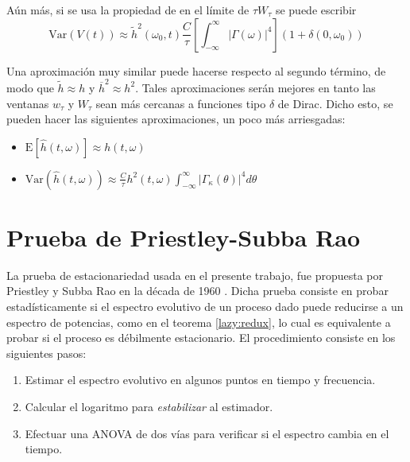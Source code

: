 \documentclass[12pt,letterpaper]{book}
\newcommand{\intR}{\int_{-\infty}^{\infty}}
\newcommand{\dirac}{$\delta$  de Dirac}
\newcommand{\est}[1]{\widehat{ #1 }}
\newcommand{\E}[1]{\mathrm{E}\left[ #1 \right]}
\newcommand{\Var}[1]{\mathrm{Var}\left( #1 \right)}
\newcommand{\abso}[1]{\left| #1 \right|}
\begin{document}
Aún más, si se usa la propiedad de en el límite de $\tau W_\tau$ se puede escribir
\begin{equation}
\Var{V(t)} \approx 
\widetilde{h}^{2}(\omega_0,t) \frac{C}{\tau} \left[ \intR \abso{\Gamma(\omega)}^{4} \right] (1+\delta(0,\omega_0))
\end{equation}

Una aproximación muy similar 
puede hacerse respecto al segundo término, de modo que $\widetilde{h}\approx h$ y 
$\overline{h}^{2}\approx h^{2}$.
Tales aproximaciones serán mejores en tanto las ventanas $w_{\tau}$ y $W_{\tau}$ sean más 
cercanas a funciones tipo \dirac.
Dicho esto, se pueden hacer las siguientes aproximaciones, un poco más arriesgadas:
\begin{itemize}
\item $\displaystyle \E{\est{h}(t,\omega)} \approx h(t,\omega)$
\item $\displaystyle \Var{\est{h}(t,\omega)} \approx 
\frac{C}{\tau} h^{2}(t,\omega) \intR \abso{\Gamma_\kappa (\theta)}^{4} d\theta$
\end{itemize}


\section{Prueba de Priestley-Subba Rao}
\label{sec:psr}

La prueba de estacionariedad usada en el presente trabajo, fue propuesta por Priestley y Subba Rao en la década de 1960 \cite{Priestley69}.
%
Dicha prueba consiste en probar estadísticamente si el espectro evolutivo de un proceso dado puede reducirse a un espectro de potencias, como en el teorema \ref{lazy:redux}, lo cual es equivalente a probar si el proceso es débilmente estacionario.
%
%
El procedimiento consiste en los siguientes pasos:
\begin{enumerate}
\item Estimar el espectro evolutivo en algunos puntos en tiempo y frecuencia.
\item Calcular el logaritmo para \textit{estabilizar} al estimador.
\item Efectuar una ANOVA de dos vías para verificar si el espectro cambia en el tiempo.
\end{enumerate}
\end{document}
